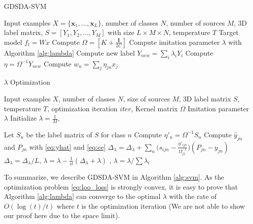 \begin{algorithm}[t]
	\caption{GDSDA-SVM}\label{alg:svm}
	\begin{algorithmic}
		\REQUIRE Input examples $X=\{\textbf{x}_1,...,\textbf{x}_L\}$, number of classes $N$, number of sources $M$, 3D label matrix, $S=[Y_1,Y_2,...,Y_{M}]$ with size $L\times M \times N$, temperature $T$ %
		\ENSURE Target model $f_t = Wx$
		\STATE Compute $\Omega=[K+\frac{\mathbf{I}}{2C}]$
		\STATE Compute imitation parameter $\lambda$ with Algorithm \ref{alg:lambda}
		\STATE Compute new label $Y_{new}=\sum_i\lambda_iY_i$
		\STATE Compute $\eta = \Omega^{-1}Y_{new}$
		\STATE Compute $w_n = \sum_j \eta_{jn}x_j$
	\end{algorithmic}	
\end{algorithm}
\begin{algorithm}[t]
	\caption{$\lambda$ Optimization}\label{alg:lambda}
\begin{algorithmic}
	\REQUIRE Input examples $X$, number of classes $N$, size of sources $M$, 3D label matrix $S$, temperature $T$, optimization iteration $iter$, Kernel matrix $\Omega$
    \ENSURE Imitation parameter $\lambda$
    \STATE Initialize $\lambda = \frac{1}{M}$, 
    
    \STATE Let $S_n$ be the label matrix of $S$ for class $n$
    \STATE Compute $\eta'_n=\Omega^{-1}S_n$ 
    \ENDFOR
	    \STATE Compute $\hat{y}_{jn}$ and $P_{jn}$ with \eqref{eq:yhat}  and \eqref{eq:ce}
	    \FOR {each $\textbf{x}_j$ in $X$}
		    \STATE $\Delta_{\lambda} = \Delta_{\lambda}+\sum_n\bigg(s_{ijn}-\frac{{\eta}'_{ijn}}{\Omega_{jj}^{-1}}\bigg)\left(P_{jn}-{y}_{jn}\right)$
	    \ENDFOR
	    \STATE $\Delta_{\lambda} =\Delta_{\lambda}/L$, $\lambda = \lambda - \frac{1}{it}(\Delta_{\lambda}+\lambda)$
	    , $\lambda = \lambda / \sum\lambda_i$
    \ENDFOR
\end{algorithmic}	
\end{algorithm}
To summarize, we describe GDSDA-SVM in Algorithm \ref{alg:svm}. As the optimization problem \eqref{eq:loo_loss} is strongly convex, it is easy to prove that Algorithm \ref{alg:lambda} can converge to the optimal $\lambda$ with the rate of $O(\log(t)/t)$ where $t$ is the optimization iteration (We are not able to show our proof here due to the space limit). 




